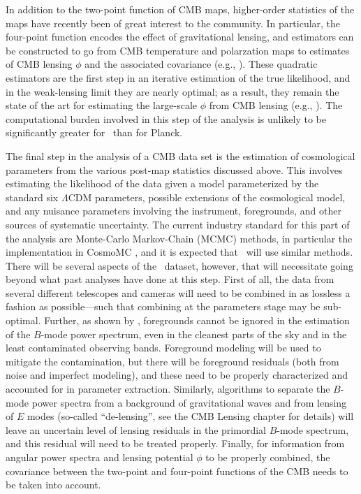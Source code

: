 In addition to the two-point function of CMB maps, higher-order statistics of the maps have recently 
been of great interest to the community. In particular, the four-point function encodes the effect of 
gravitational lensing, and estimators can be constructed to go from CMB temperature and polarzation
maps to estimates of CMB lensing $\phi$ and the associated covariance (e.g., \cite{hu02a,okamoto03}).
These quadratic estimators are the first step in an iterative estimation of the true likelihood, and in
the weak-lensing limit they are nearly optimal; as a result, they remain the state of the art for estimating
the large-scale $\phi$ from CMB lensing (e.g., \cite{planck13-18}). The computational burden involved
in this step of the analysis is unlikely to be significantly greater for \cmbexp\ than for Planck.

The final step in the analysis of a CMB data set is the estimation of cosmological parameters from
the various post-map statistics discussed above. This involves estimating the likelihood of the data
given a model parameterized by the standard six $\Lambda$CDM parameters, possible extensions
of the cosmological model, and any nuisance parameters involving the instrument, foregrounds, and
other sources of systematic uncertainty. The current industry standard for this part of the analysis are
Monte-Carlo Markov-Chain (MCMC) methods, in particular the implementation in CosmoMC
\cite{lewis02b}, and it is expected that \cmbexp\ will use similar methods. There will be several 
aspects of the \cmbexp\ dataset, however, that will necessitate going beyond what past analyses
have done at this step. First of all, the data from several different telescopes and cameras will need
to be combined in as lossless a fashion as possible---such that combining at the parameters stage
may be sub-optimal.
Further, as shown by \cite{bicepkeckplanck15}, foregrounds cannot be ignored in the 
estimation of the $B$-mode power spectrum, even in the cleanest parts of the sky and in the 
least contaminated observing bands. Foreground modeling will be used to mitigate the contamination,
but there will be foreground residuals (both from noise and imperfect modeling), and these need
to be properly characterized and accounted for in parameter extraction. 
Similarly, algorithms to separate the $B$-mode power spectra from a background of gravitational
waves and from lensing of $E$ modes (so-called ``de-lensing'', see the CMB Lensing chapter for 
details) will leave an uncertain level of lensing residuals in the primordial $B$-mode spectrum, and
this residual will need to be treated properly. Finally, for information from angular power spectra
and lensing potential $\phi$ to be properly combined, the covariance between the two-point and
four-point functions of the CMB needs to be taken into account.


